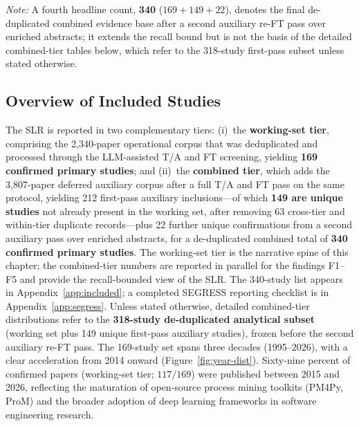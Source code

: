 \begin{table}[htbp]
\smallskip
\footnotesize\textit{Note:} A fourth headline count, \textbf{340} ($169 + 149 + 22$), denotes the
final de-duplicated combined evidence base after a second auxiliary re-FT pass
over enriched abstracts; it extends the recall bound but is not the basis of the
detailed combined-tier tables below, which refer to the 318-study first-pass
subset unless stated otherwise.
\end{table}

\subsection{Overview of Included Studies}

The SLR is reported in two complementary tiers: (i)~the
\textbf{working-set tier}, comprising the 2{,}340-paper operational corpus
that was deduplicated and processed through the LLM-assisted T/A and FT
screening, yielding \textbf{169 confirmed primary studies}; and (ii)~the
\textbf{combined tier}, which adds the 3{,}807-paper deferred auxiliary
corpus after a full T/A and FT pass on the same protocol, yielding
212 first-pass auxiliary inclusions---of which \textbf{149 are unique
studies} not already present in the working set, after removing 63
cross-tier and within-tier duplicate records---plus 22 further
unique confirmations from a second auxiliary pass over enriched abstracts,
for a de-duplicated combined total of \textbf{340 confirmed primary
studies}. The working-set tier is the narrative spine of this chapter; the
combined-tier numbers are reported in parallel for the findings F1--F5 and
provide the recall-bounded view of the SLR. The 340-study list appears in
Appendix~\ref{app:included}; a completed SEGRESS reporting checklist is in
Appendix~\ref{app:segress}. Unless stated otherwise,
detailed combined-tier distributions refer to the \textbf{318-study
de-duplicated analytical subset} (working set plus 149 unique first-pass
auxiliary studies), frozen before the second auxiliary re-FT pass. The 169-study set spans three decades (1995--2026), with a clear
acceleration from 2014 onward (Figure~\ref{fig:year-dist}). Sixty-nine
percent of confirmed papers (working-set tier; $117/169$) were published between 2015
and 2026, reflecting the maturation of open-source process mining toolkits
(PM4Py, ProM) and the broader adoption of deep learning frameworks in
software engineering research.


